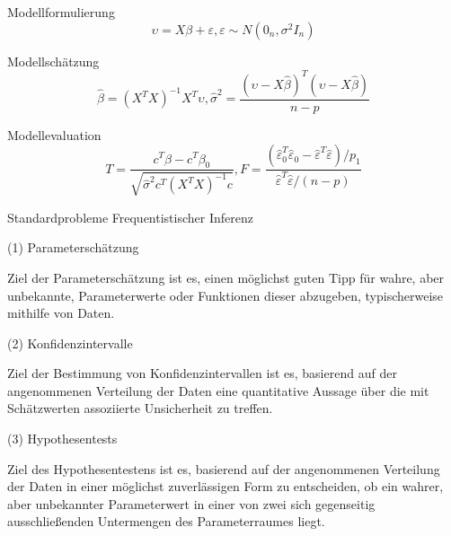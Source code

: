 \documentclass[
  8pt,
  ignorenonframetext,
]{beamer}
\begin{document}
\begin{frame}{}
\protect\hypertarget{section-3}{}
\vspace{1mm}
\normalsize

Modellformulierung \vspace{1mm} \small \begin{equation}
\upsilon = X\beta + \varepsilon, \varepsilon \sim N(0_n,\sigma^2I_n)
\end{equation} \vspace{5mm}

\normalsize

Modellschätzung \small \begin{equation}
\hat{\beta} = (X^TX)^{-1} X^T\upsilon,  \hat{\sigma}^2 = \frac{(\upsilon-X\hat{\beta})^T(\upsilon-X\hat{\beta})}{n-p}
\end{equation} \vspace{4mm}

\normalsize

Modellevaluation \small \begin{equation}
T = \frac{c^T\hat{\beta} - c^T\beta_0}{\sqrt{\hat{\sigma}^2c^T(X^TX)^{-1}c}},
F = \frac{(\hat{\varepsilon}_0^T\hat{\varepsilon}_0 - \hat{\varepsilon}^T\hat{\varepsilon})/p_1}{\hat{\varepsilon}^T\hat{\varepsilon}/(n-p)}
\end{equation}
\end{frame}

\begin{frame}{}
\protect\hypertarget{section-4}{}
Standardprobleme Frequentistischer Inferenz

\small
\vspace{2mm}

\noindent (1) Parameterschätzung

Ziel der Parameterschätzung ist es, einen möglichst guten Tipp für
wahre, aber unbekannte, Parameterwerte oder Funktionen dieser abzugeben,
typischerweise mithilfe von Daten.

\vspace{2mm}

\noindent (2) Konfidenzintervalle

Ziel der Bestimmung von Konfidenzintervallen ist es, basierend auf der
angenommenen Verteilung der Daten eine quantitative Aussage über die mit
Schätzwerten assoziierte Unsicherheit zu treffen.

\vspace{2mm}

\noindent (3) Hypothesentests

Ziel des Hypothesentestens ist es, basierend auf der angenommenen
Verteilung der Daten in einer möglichst zuverlässigen Form zu
entscheiden, ob ein wahrer, aber unbekannter Parameterwert in einer von
zwei sich gegenseitig ausschließenden Untermengen des Parameterraumes
liegt.
\end{frame}
\end{document}
